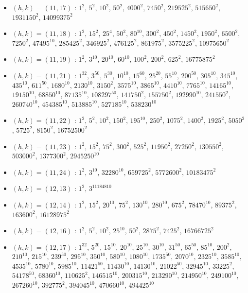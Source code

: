 \begin{itemize}
\item $(h,k)=(11,17)$ : $1^{2}$, $5^{2}$, $10^{2}$, $50^{2}$, $4000^{2}$, $7450^{2}$, $219525^{2}$, $515650^{2}$, $1931150^{2}$, $14099375^{2}$
\item $(h,k)=(11,18)$ : $1^{2}$, $15^{2}$, $25^{4}$, $50^{2}$, $80^{10}$, $300^{2}$, $450^{2}$, $1450^{2}$, $1950^{2}$, $6500^{2}$, $7250^{2}$, $47495^{10}$, $285425^{2}$, $346925^{2}$, $476125^{2}$, $861975^{2}$, $3575225^{2}$, $10975650^{2}$
\item $(h,k)=(11,19)$ : $1^{2}$, $3^{10}$, $20^{10}$, $60^{10}$, $100^{2}$, $200^{2}$, $625^{2}$, $16775875^{2}$
\item $(h,k)=(11,21)$ : $1^{32}$, $3^{50}$, $5^{30}$, $10^{10}$, $15^{60}$, $25^{20}$, $55^{10}$, $200^{50}$, $305^{10}$, $345^{10}$, $435^{10}$, $611^{50}$, $1680^{10}$, $2130^{10}$, $3150^{2}$, $3575^{10}$, $3865^{10}$, $4410^{10}$, $7765^{10}$, $14165^{10}$, $19150^{10}$, $68850^{10}$, $87135^{10}$, $108297^{50}$, $141750^{2}$, $155750^{2}$, $192990^{10}$, $241550^{2}$, $260740^{10}$, $454385^{10}$, $513885^{10}$, $527185^{10}$, $538230^{10}$
\item $(h,k)=(11,22)$ : $1^{2}$, $5^{2}$, $10^{2}$, $150^{2}$, $195^{10}$, $250^{2}$, $1075^{2}$, $1400^{2}$, $1925^{2}$, $5050^{2}$, $5725^{2}$, $8150^{2}$, $16752500^{2}$
\item $(h,k)=(11,23)$ : $1^{2}$, $15^{2}$, $75^{2}$, $300^{2}$, $525^{2}$, $11950^{2}$, $27250^{2}$, $130550^{2}$, $503000^{2}$, $1377300^{2}$, $2945250^{10}$
\item $(h,k)=(11,24)$ : $1^{2}$, $3^{10}$, $32280^{10}$, $659725^{2}$, $5772600^{2}$, $10183475^{2}$
\item $(h,k)=(12,13)$ : $1^{2}$, $3^{11184810}$
\item $(h,k)=(12,14)$ : $1^{2}$, $15^{2}$, $20^{10}$, $75^{2}$, $130^{10}$, $280^{10}$, $675^{2}$, $78470^{10}$, $89375^{2}$, $163600^{2}$, $16128975^{2}$
\item $(h,k)=(12,16)$ : $1^{2}$, $5^{2}$, $10^{2}$, $25^{10}$, $50^{2}$, $2875^{2}$, $7425^{2}$, $16766725^{2}$
\item $(h,k)=(12,17)$ : $1^{32}$, $5^{20}$, $15^{10}$, $20^{10}$, $25^{10}$, $30^{10}$, $31^{50}$, $65^{50}$, $85^{10}$, $200^{2}$, $210^{10}$, $215^{10}$, $239^{50}$, $295^{10}$, $350^{10}$, $580^{10}$, $1080^{10}$, $1735^{50}$, $2070^{10}$, $2325^{10}$, $3585^{10}$, $4535^{10}$, $5780^{10}$, $5985^{10}$, $11421^{50}$, $11430^{10}$, $14130^{10}$, $21022^{50}$, $32945^{10}$, $33225^{2}$, $54178^{50}$, $68360^{10}$, $110625^{2}$, $146515^{10}$, $200315^{10}$, $213290^{10}$, $214950^{10}$, $249100^{10}$, $267260^{10}$, $392775^{2}$, $394045^{10}$, $470660^{10}$, $494425^{10}$

\end{itemize}
